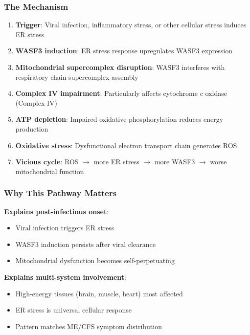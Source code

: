 \subsubsection{The Mechanism}

\begin{enumerate}
    \item \textbf{Trigger}: Viral infection, inflammatory stress, or other cellular stress induces ER stress
    \item \textbf{WASF3 induction}: ER stress response upregulates WASF3 expression
    \item \textbf{Mitochondrial supercomplex disruption}: WASF3 interferes with respiratory chain supercomplex assembly
    \item \textbf{Complex IV impairment}: Particularly affects cytochrome c oxidase (Complex IV)
    \item \textbf{ATP depletion}: Impaired oxidative phosphorylation reduces energy production
    \item \textbf{Oxidative stress}: Dysfunctional electron transport chain generates ROS
    \item \textbf{Vicious cycle}: ROS $\rightarrow$ more ER stress $\rightarrow$ more WASF3 $\rightarrow$ worse mitochondrial function
\end{enumerate}

\subsubsection{Why This Pathway Matters}

\textbf{Explains post-infectious onset}:
\begin{itemize}
    \item Viral infection triggers ER stress
    \item WASF3 induction persists after viral clearance
    \item Mitochondrial dysfunction becomes self-perpetuating
\end{itemize}

\textbf{Explains multi-system involvement}:
\begin{itemize}
    \item High-energy tissues (brain, muscle, heart) most affected
    \item ER stress is universal cellular response
    \item Pattern matches ME/CFS symptom distribution
\end{itemize}

